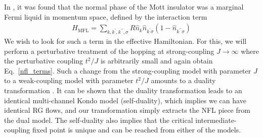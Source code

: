 \documentclass{revtex4-2}
\begin{document}
In \cite{anirbanurg1}, it was found that the normal phase of the Mott insulator was a marginal Fermi liquid in momentum space, defined by the interaction term 
\begin{equation}\begin{aligned}
	\label{mfl_urg}
	H_\text{MFL} = \sum_{k,k^\prime,k^{\prime\prime},\sigma}R \hat n_{k} \hat n_{k^\prime \overline\sigma}\left(1 - \hat n_{k^{\prime\prime}\sigma}\right) 
\end{aligned}\end{equation}
We wish to look for such a term in the effective Hamiltonian. For this, we will perform a perturbative treatment of the hopping at strong-coupling \(J \to \infty\) where the perturbative coupling \(t^2/J\) is arbitrarily small and again obtain Eq.~\ref{nfl_terms}. Such a change from the strong-coupling model with parameter \(J\) to a weak-coupling model with parameter \(t^2/J\) amounts to a duality transformation \cite{kroha_kolf_2007,zitko_fabrozio_2017}. It can be shown that the duality transformation leads to an identical multi-channel Kondo model \cite{kroha_kolf_2007} (self-duality), which implies we can have identical RG flows, and our transformation simply extracts the NFL piece from the dual model. The self-duality also implies that the critical intermediate-coupling fixed point is unique and can be reached from either of the models.
\end{document}

